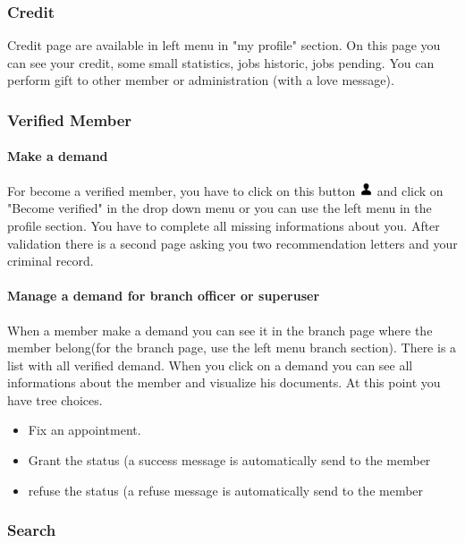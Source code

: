 \documentclass[11pt, a4paper]{article}   	%
\begin{document}
\subsubsection{Credit}

Credit page are available in left menu in "my profile" section. On this page you can see your credit, some small statistics, jobs historic, jobs pending. You can perform gift to other member or administration (with a love message).

\subsubsection{Verified Member}

\paragraph{Make a demand}
For become a verified member, you have to click on this button \includegraphics[width=0.4cm]{user_icon.png} and click on "Become verified" in the drop down menu or you can use the left menu in the profile section.
You have to complete all missing informations about you. After validation there is a second page asking you two recommendation letters and your criminal record.

\paragraph{Manage a demand for branch officer or superuser}
When a member make a demand you can see it in the branch page where the member belong(for the branch page, use the left menu branch section). There is a list with all verified demand. When you click on a demand you can see all informations about the member and visualize his documents. At this point you have tree choices. 
\begin{itemize}
	\item Fix an appointment.
	\item Grant the status (a success message is automatically send to the member
	\item refuse the status (a refuse message is automatically send to the member
\end{itemize}

\subsubsection{Search}
\end{document}
